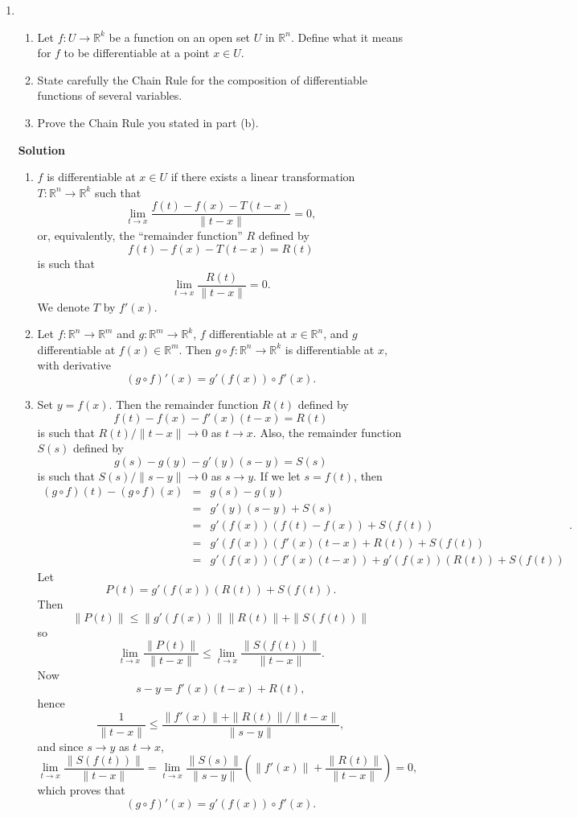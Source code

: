 \documentclass{article}
\begin{document}
\begin{enumerate}
\item 

\begin{enumerate}
\item Let \(f : U \to \mathbb{R}^k\) be a function on an open set \(U\) in \(\mathbb{R}^n\).  Define what it means for \(f\) to be differentiable at a point \(x \in U\).

\item State carefully the Chain Rule for the composition of differentiable functions of several variables.

\item Prove the Chain Rule you stated in part (b).

\end{enumerate}

{\bf Solution}

\begin{enumerate}
\item \(f\) is differentiable at \(x \in U\) if there exists a linear transformation \(T : \mathbb{R}^n \to \mathbb{R}^k\) such that
\[\lim_{t \to x} \frac{f(t) - f(x) - T(t - x)}{\|t - x\|} = 0,\]
or, equivalently, the ``remainder function'' \(R\) defined by
\[f(t) - f(x) - T(t - x) = R(t)\]
is such that
\[\lim_{t \to x} \frac{R(t)}{\|t - x\|} = 0.\]
We denote \(T\) by \(f'(x)\).

\item Let \(f : \mathbb{R}^n \to \mathbb{R}^m\) and \(g : \mathbb{R}^m \to \mathbb{R}^k\), \(f\) differentiable at \(x \in \mathbb{R}^n\), and \(g\) differentiable at \(f(x) \in \mathbb{R}^m\).  Then \(g \circ f : \mathbb{R}^n \to \mathbb{R}^k\) is differentiable at \(x\), with derivative
\[(g \circ f)'(x) = g'(f(x)) \circ f'(x).\]

\item Set \(y = f(x)\).  Then the remainder function \(R(t)\) defined by
\[f(t) - f(x) - f'(x)(t - x) = R(t)\]
is such that \(R(t) / \|t - x\| \to 0\) as \(t \to x\).  Also, the remainder function \(S(s)\) defined by
\[g(s) - g(y) - g'(y)(s - y) = S(s)\]
is such that \(S(s) / \|s - y\| \to 0\) as \(s \to y\).  If we let \(s = f(t)\), then
\[\begin{array}{rcl}
  (g \circ f)(t) - (g \circ f)(x)
  & = & g(s) - g(y) \\
  & = & g'(y)(s - y) + S(s) \\
  & = & g'(f(x))(f(t) - f(x)) + S(f(t)) \\
  & = & g'(f(x))(f'(x)(t - x) + R(t)) + S(f(t)) \\
  & = & g'(f(x))(f'(x)(t - x)) + g'(f(x))(R(t)) + S(f(t))
  \end{array}.\]
Let
\[P(t) = g'(f(x))(R(t)) + S(f(t)).\]
Then
\[\|P(t)\| \leq \|g'(f(x))\| \|R(t)\| + \|S(f(t))\|\]
so
\[\lim_{t \to x} \frac{\|P(t)\|}{\|t - x\|}
  \leq \lim_{t \to x} \frac{\|S(f(t))\|}{\|t - x\|}.\]
Now
\[s - y = f'(x)(t - x) + R(t),\]
hence
\[\frac{1}{\|t - x\|} \leq \frac{\|f'(x)\| + \|R(t)\|/\|t - x\|}{\|s - y\|},\]
and since \(s \to y\) as \(t \to x\),
\[\lim_{t \to x} \frac{\|S(f(t))\|}{\|t - x\|}
  = \lim_{t \to x} \frac{\|S(s)\|}{\|s - y\|} \left( \|f'(x)\| + \frac{\|R(t)\|}{\|t - x\|} \right)
  = 0,\]
which proves that
\[(g \circ f)'(x) = g'(f(x)) \circ f'(x).\]


\end{enumerate}
\end{enumerate}
\end{document}
